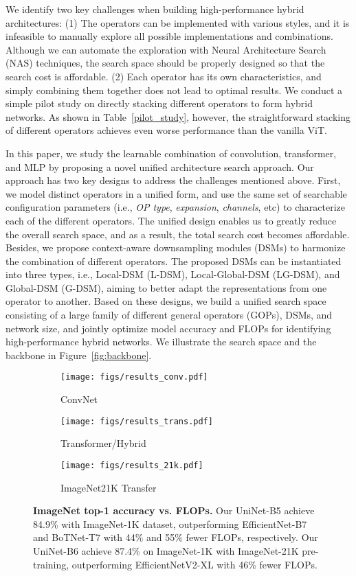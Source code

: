 \documentclass[runningheads]{llncs}
\begin{document}
We identify two key challenges when building high-performance hybrid architectures: (1) The operators can be implemented with various styles, and it is infeasible to manually explore all possible implementations and combinations. Although we can automate the exploration with Neural Architecture Search (NAS) techniques, the search space should be properly designed so that the search cost is affordable. (2) Each operator has its own characteristics, and simply combining them together does not lead to optimal results. We conduct a simple pilot study on directly stacking different operators to form hybrid networks. As shown in Table~\ref{pilot_study}, however, the straightforward stacking of different operators achieves even worse performance than the vanilla ViT.


In this paper, we study the learnable combination of convolution, transformer, and MLP by proposing a novel unified architecture search approach. Our approach has two key designs to address the challenges mentioned above. 
First, we model distinct operators in a unified form, and use the same
set of searchable configuration parameters (i.e., \textit{OP type}, \textit{expansion}, \textit{channels}, etc) to characterize each of the different operators.
The unified design enables us to greatly reduce the overall search space, and as a result, the total search cost becomes affordable. Besides, we propose context-aware downsampling modules (DSMs) to harmonize the combination of different operators. The proposed DSMs can be instantiated into three types, i.e., Local-DSM (L-DSM), Local-Global-DSM (LG-DSM), and Global-DSM (G-DSM), aiming to better adapt the representations from one operator to another. 
Based on these designs, we build a unified search space consisting of a large family of different general operators (GOPs), DSMs, and network size, and jointly optimize model accuracy and FLOPs for identifying high-performance hybrid networks. We illustrate the search space and the backbone in Figure~\ref{fig:backbone}.



\begin{figure*}[t]
    \centering
    \begin{subfigure}[b]{0.31\textwidth}
        \texttt{[image: figs/results\_conv.pdf]}
\caption{ConvNet}
    \end{subfigure}
\centering
    \begin{subfigure}[b]{0.31\textwidth}
        \texttt{[image: figs/results\_trans.pdf]}
\caption{Transformer/Hybrid}
    \end{subfigure}
\centering
    \begin{subfigure}[b]{0.31\textwidth}
        \texttt{[image: figs/results\_21k.pdf]}
\caption{ImageNet21K Transfer}
    \end{subfigure}
\caption{\textbf{ImageNet top-1 accuracy vs. FLOPs.} Our UniNet-B5 achieve 84.9\% with ImageNet-1K dataset, outperforming EfficientNet-B7 and BoTNet-T7 with 44\% and 55\% fewer FLOPs, respectively. Our UniNet-B6 achieve 87.4\% on ImageNet-1K with ImageNet-21K pre-training, outperforming EfficientNetV2-XL with 46\% fewer FLOPs.}
    \label{fig:sota}
\end{figure*}
\end{document}
